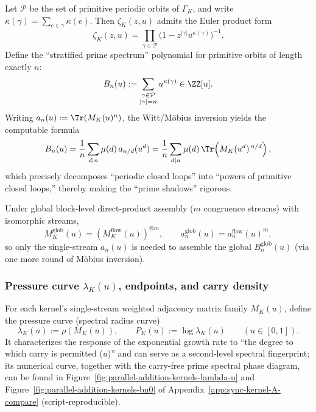 Let $\mathcal{P}$ be the set of primitive periodic orbits of $\Gamma_K$, and write $\kappa(\gamma)=\sum_{e\in\gamma}\kappa(e)$. Then $\zeta_K(z,u)$ admits the Euler product form
\[
\zeta_K(z,u)=\prod_{\gamma\in\mathcal{P}}\bigl(1-z^{|\gamma|}u^{\kappa(\gamma)}\bigr)^{-1}.
\]
Define the ``stratified prime spectrum'' polynomial for primitive orbits of length exactly $n$:
\[
B_n(u):=\sum_{\substack{\gamma\in\mathcal{P}\\|\gamma|=n}}u^{\kappa(\gamma)}\in\ZZ[u].
\]
Writing $a_n(u):=\Tr(M_K(u)^n)$, the Witt/M\"obius inversion yields the computable formula
\[
B_n(u)=\frac{1}{n}\sum_{d\mid n}\mu(d)\,a_{n/d}(u^d)
=\frac{1}{n}\sum_{d\mid n}\mu(d)\,\Tr\!\left(M_K(u^d)^{\,n/d}\right),
\]
which precisely decomposes ``periodic closed loops'' into ``powers of primitive closed loops,'' thereby making the ``prime shadows'' rigorous.

Under global block-level direct-product assembly ($m$ congruence streams) with isomorphic streams,
\[
M_K^{\mathrm{glob}}(u)=(M_K^{\mathrm{flow}}(u))^{\otimes m},\qquad
a_n^{\mathrm{glob}}(u)=a_n^{\mathrm{flow}}(u)^m,
\]
so only the single-stream $a_n(u)$ is needed to assemble the global $B_n^{\mathrm{glob}}(u)$ (via one more round of M\"obius inversion).

\subsubsection{Pressure curve \texorpdfstring{$\lambda_K(u)$}{lambda(u)}, endpoints, and carry density}\label{subsec:kernel-pressure-curve}
For each kernel's single-stream weighted adjacency matrix family $M_K(u)$, define the pressure curve (spectral radius curve)
\[
\lambda_K(u):=\rho(M_K(u)),\qquad P_K(u):=\log\lambda_K(u)\qquad(u\in[0,1]).
\]
It characterizes the response of the exponential growth rate to ``the degree to which carry is permitted ($u$)'' and can serve as a second-level spectral fingerprint; its numerical curve, together with the carry-free prime spectral phase diagram, can be found in Figure~\ref{fig:parallel-addition-kernels-lambda-u} and Figure~\ref{fig:parallel-addition-kernels-bn0} of Appendix~\ref{app:sync-kernel-A-compare} (script-reproducible).

